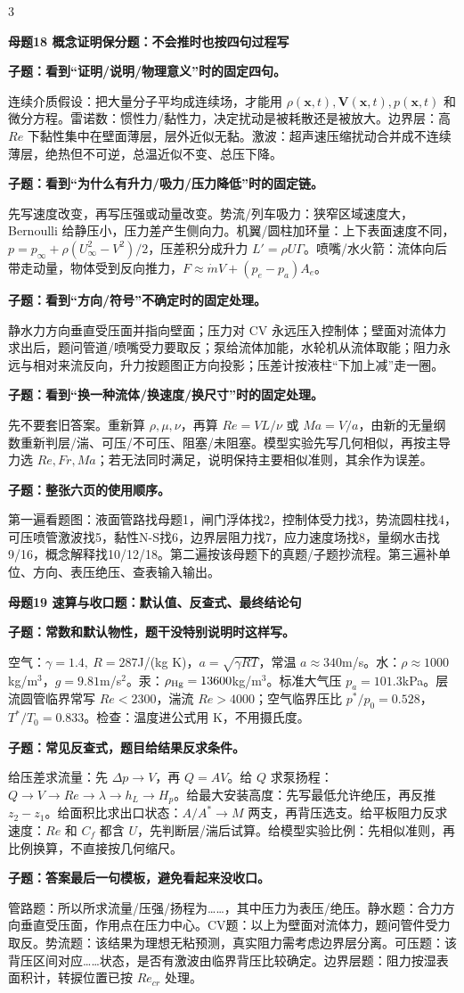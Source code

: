 \documentclass[a4paper]{article}
\newcommand{\mt}[1]{\vspace{0.45pt}\colorbox{M}{\parbox{\dimexpr\linewidth-2\fboxsep}{\color{white}\bfseries #1}}\par}
\newcommand{\qt}[1]{\vspace{0.25pt}\colorbox{Q}{\parbox{\dimexpr\linewidth-2\fboxsep}{\color{white}\bfseries #1}}\par}
\newcommand{\ans}[1]{\colorbox{G}{\parbox{\dimexpr\linewidth-2\fboxsep}{#1}}\par}
\begin{document}
\begin{multicols}{3}
\mt{母题18 概念证明保分题：不会推时也按四句过程写}
\qt{子题：看到“证明/说明/物理意义”时的固定四句。}
\ans{连续介质假设：把大量分子平均成连续场，才能用 $\rho(\bm x,t),\bm V(\bm x,t),p(\bm x,t)$ 和微分方程。雷诺数：惯性力/黏性力，决定扰动是被耗散还是被放大。边界层：高 $Re$ 下黏性集中在壁面薄层，层外近似无黏。激波：超声速压缩扰动合并成不连续薄层，绝热但不可逆，总温近似不变、总压下降。}
\qt{子题：看到“为什么有升力/吸力/压力降低”时的固定链。}
\ans{先写速度改变，再写压强或动量改变。势流/列车吸力：狭窄区域速度大，Bernoulli 给静压小，压力差产生侧向力。机翼/圆柱加环量：上下表面速度不同，$p=p_\infty+\rho(U_\infty^2-V^2)/2$，压差积分成升力 $L'=\rho U\Gamma$。喷嘴/水火箭：流体向后带走动量，物体受到反向推力，$F\approx\dot mV+(p_e-p_a)A_e$。}
\qt{子题：看到“方向/符号”不确定时的固定处理。}
\ans{静水力方向垂直受压面并指向壁面；压力对 CV 永远压入控制体；壁面对流体力求出后，题问管道/喷嘴受力要取反；泵给流体加能，水轮机从流体取能；阻力永远与相对来流反向，升力按题图正方向投影；压差计按液柱“下加上减”走一圈。}
\qt{子题：看到“换一种流体/换速度/换尺寸”时的固定处理。}
\ans{先不要套旧答案。重新算 $\rho,\mu,\nu$，再算 $Re=VL/\nu$ 或 $Ma=V/a$，由新的无量纲数重新判层/湍、可压/不可压、阻塞/未阻塞。模型实验先写几何相似，再按主导力选 $Re,Fr,Ma$；若无法同时满足，说明保持主要相似准则，其余作为误差。}
\qt{子题：整张六页的使用顺序。}
\ans{第一遍看题图：液面管路找母题1，闸门浮体找2，控制体受力找3，势流圆柱找4，可压喷管激波找5，黏性N-S找6，边界层阻力找7，应力速度场找8，量纲水击找9/16，概念解释找10/12/18。第二遍按该母题下的真题/子题抄流程。第三遍补单位、方向、表压绝压、查表输入输出。}

\mt{母题19 速算与收口题：默认值、反查式、最终结论句}
\qt{子题：常数和默认物性，题干没特别说明时这样写。}
\ans{空气：$\gamma=1.4,\ R=287$J/(kg K)，$a=\sqrt{\gamma RT}$，常温 $a\approx340$m/s。水：$\rho\approx1000$kg/m$^3$，$g=9.81$m/s$^2$。汞：$\rho_{\rm Hg}=13600$kg/m$^3$。标准大气压 $p_a=101.3$kPa。层流圆管临界常写 $Re<2300$，湍流 $Re>4000$；空气临界压比 $p^*/p_0=0.528$，$T^*/T_0=0.833$。检查：温度进公式用 K，不用摄氏度。}
\qt{子题：常见反查式，题目给结果反求条件。}
\ans{给压差求流量：先 $\Delta p\to V$，再 $Q=AV$。给 $Q$ 求泵扬程：$Q\to V\to Re\to\lambda\to h_L\to H_p$。给最大安装高度：先写最低允许绝压，再反推 $z_2-z_1$。给面积比求出口状态：$A/A^*\to M$ 两支，再背压选支。给平板阻力反求速度：$Re$ 和 $C_f$ 都含 $U$，先判断层/湍后试算。给模型实验比例：先相似准则，再比例换算，不直接按几何缩尺。}
\qt{子题：答案最后一句模板，避免看起来没收口。}
\ans{管路题：所以所求流量/压强/扬程为……，其中压力为表压/绝压。静水题：合力方向垂直受压面，作用点在压力中心。CV题：以上为壁面对流体力，题问管件受力取反。势流题：该结果为理想无粘预测，真实阻力需考虑边界层分离。可压题：该背压区间对应……状态，是否有激波由临界背压比较确定。边界层题：阻力按湿表面积计，转捩位置已按 $Re_{cr}$ 处理。}
\end{multicols}
\end{document}
